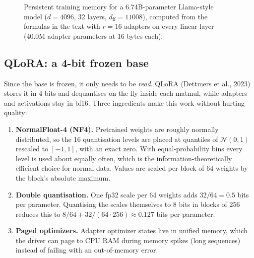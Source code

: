 \begin{figure}[ht]
\centering
{}
\caption{Persistent training memory for a 6.74B-parameter Llama-style model
($d=4096$, 32 layers, $d_\text{ff}=11008$), computed from the formulas in the text with
$r=16$ adapters on every linear layer (40.0M adapter parameters at 16 bytes each).}
\label{fig:instruct:membars}
\end{figure}

\subsection{QLoRA: a 4-bit frozen base}\label{sec:instruct:qlora}

Since the base is frozen, it only needs to be \emph{read}. QLoRA (Dettmers et al., 2023)
stores it in 4 bits and dequantises on the fly inside each matmul, while adapters and
activations stay in bf16. Three ingredients make this work without hurting quality:

\begin{enumerate}
\item \textbf{NormalFloat-4 (NF4).} Pretrained weights are roughly normally distributed,
so the 16 quantisation levels are placed at quantiles of $\mathcal{N}(0,1)$ rescaled to
$[-1,1]$, with an exact zero. With equal-probability bins every level is used about
equally often, which is the information-theoretically efficient choice for normal data.
Values are scaled per block of 64 weights by the block's absolute maximum.
\item \textbf{Double quantisation.} One fp32 scale per 64 weights adds $32/64=0.5$
bits per parameter. Quantising the scales themselves to 8 bits in blocks of 256
reduces this to $8/64 + 32/(64\cdot256)\approx0.127$ bits per parameter.
\item \textbf{Paged optimizers.} Adapter optimizer states live in unified memory, which
the driver can page to CPU RAM during memory spikes (long sequences) instead of failing
with an out-of-memory error.
\end{enumerate}

